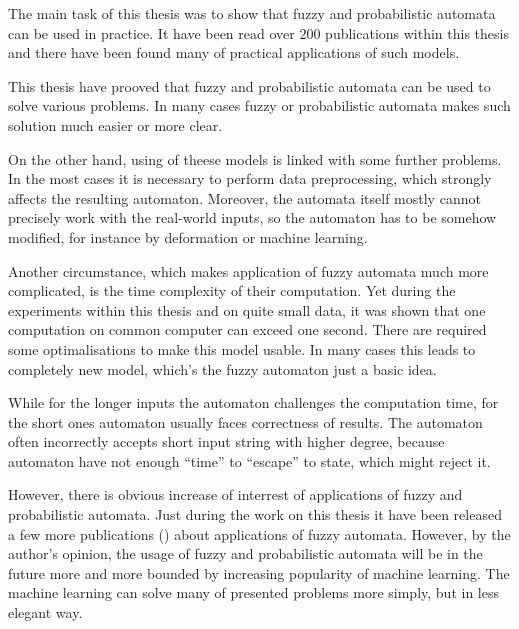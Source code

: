 \documentclass[
  master,
  field=inf,
  biblatex=true,
  language=czech,
  theorems=false,
  sourcecodes=false,
  glossaries=false,
  index=false,
]{kidiplom}
\numberwithin{definition}{section}
\numberwithin{theorem}{section}
\numberwithin{note}{section}
\numberwithin{example}{section}
\begin{document}
\begin{kiconclusions}[english]
The main task of this thesis was to show that fuzzy and probabilistic automata can be used in practice. It have been read over $200$ publications within this thesis and there have been found many of practical applications of such models.

This thesis have prooved that fuzzy and probabilistic automata can be used to solve various problems. In many cases fuzzy or probabilistic automata makes such solution much easier or more clear.

On the other hand, using of theese models is linked with some further problems. In the most cases it is necessary to perform data preprocessing, which strongly affects the resulting automaton. Moreover, the automata itself mostly cannot precisely work with the real-world inputs, so the automaton has to be somehow modified, for instance by deformation or machine learning.

Another circumstance, which makes application of fuzzy automata much more complicated, is the time complexity of their computation. Yet during the experiments within this thesis and on quite small data, it was shown that one computation on common computer can exceed one second. There are required some optimalisations to make this model usable. In many cases this leads to completely new model, which's the fuzzy automaton just a basic idea.

While for the longer inputs the automaton challenges the computation time, for the short ones automaton usually faces correctness of results. The automaton often incorrectly accepts short input string with higher degree, because automaton have not enough ``time'' to ``escape'' to state, which might reject it.

However, there is obvious increase of interrest of applications of fuzzy and probabilistic automata. Just during the work on this thesis it have been released a few more publications (\cite{MukRay-StaSplMerProbFiStaAuSigRepAna, ManPra-PriPatDetUsFiStMaFuzTra, Jia+-ExHeaSimMetBasIntHumTheMod, GupRah-CliMonUsFuzSys, CamMerNun-UsFuzAutDiagPrHeaPro}) about applications of fuzzy automata. However, by the author's opinion, the usage of fuzzy and probabilistic automata will be in the future more and more bounded by increasing popularity of machine learning. The machine learning can solve many of presented problems more simply, but in less elegant way.
\end{kiconclusions}

\appendix
\end{document}
